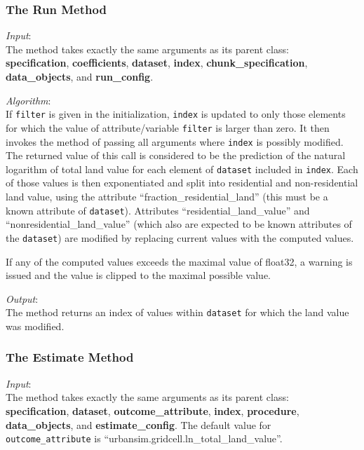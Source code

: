 \subsubsection{The Run Method}
%
{\it Input}:\\[1mm]
The  method takes exactly the same arguments as its parent
class:\\
{\bf specification}, {\bf coefficients}, {\bf dataset}, {\bf index}, {\bf
  chunk_specification}, {\bf data_objects}, and {\bf run_config}.

{\it Algorithm}:\\[1mm]
If \verb|filter| is given in the initialization, \verb|index| is
updated to only those elements for which the value of
attribute/variable \verb|filter| is
larger than zero. It then invokes the  method of
 passing all arguments where
\verb|index| is possibly modified. The returned value of this call
is considered to be the prediction of the natural logarithm of total
land value for each element of \verb|dataset| included in
\verb|index|. Each of those values is then exponentiated and split
into residential and non-residential land value, using the attribute
\attributesindex ``fraction_residential_land'' (this must be a known
attribute of \verb|dataset|).
Attributes ``residential_land_value'' and
``nonresidential_land_value'' (which also are expected to be known
attributes  of the \verb|dataset|) are modified by
replacing current values with the computed values.

If any of the computed values exceeds the maximal value of float32, a warning
is issued and the value is clipped to the maximal possible value.

{\it Output}:\\[1mm]
The method returns an index of values within \verb|dataset| for which the land
value was modified.

\subsubsection{The Estimate Method}
{\it Input}:\\[1mm]
The  method takes exactly the same arguments as its parent
class: \\
{\bf specification}, {\bf dataset}, {\bf outcome_attribute}, {\bf index}, {\bf
  procedure}, {\bf data_objects}, and {\bf estimate_config}. The default value 
for \verb|outcome_attribute| is ``urbansim.gridcell.ln_total_land_value''.

